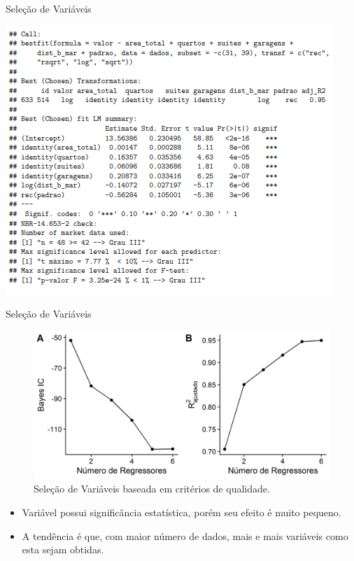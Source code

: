 \documentclass[9pt,ignorenonframetext,aspectratio=169]{beamer}
\providecommand{\tightlist}{%
  \setlength{\itemsep}{0pt}\setlength{\parskip}{0pt}}
\begin{document}
\begin{frame}{Seleção de Variáveis}
\protect\hypertarget{seleuxe7uxe3o-de-variuxe1veis-1}{}

\begin{center}\includegraphics[width=0.7\linewidth]{../../images/modelo} \end{center}

\end{frame}

\begin{frame}{Seleção de Variáveis}
\protect\hypertarget{seleuxe7uxe3o-de-variuxe1veis-2}{}

\begin{figure}

{\centering \includegraphics[width=0.8\linewidth]{images/regsub2-1} 

}

\caption{Seleção de Variáveis baseada em critérios de qualidade.}\label{fig:regsub2}
\end{figure}

\begin{itemize}[<+->]
\tightlist
\item
  Variável possui significância estatística, porém seu efeito é muito
  pequeno.
\item
  A tendência é que, com maior número de dados, mais e mais variáveis
  como esta sejam obtidas.
\end{itemize}

\end{frame}
\end{document}
